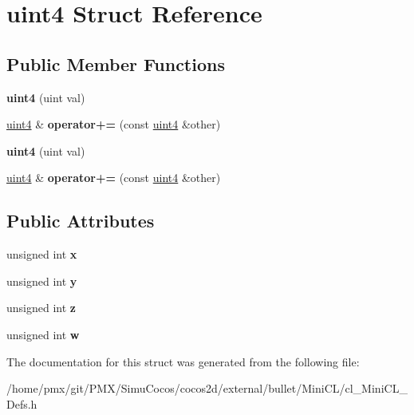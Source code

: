 \hypertarget{structuint4}{}\section{uint4 Struct Reference}
\label{structuint4}
\subsection*{Public Member Functions}
\begin{DoxyCompactItemize}
\item 
\mbox{\label{structuint4_a1804004744b3cc7230dba8c5d9082044}} 
{\bfseries uint4} (uint val)
\item 
\mbox{\label{structuint4_a684ea0df820c3d948f6745d1760df90b}} 
\hyperlink{structuint4}{uint4} \& {\bfseries operator+=} (const \hyperlink{structuint4}{uint4} \&other)
\item 
\mbox{\label{structuint4_a1804004744b3cc7230dba8c5d9082044}} 
{\bfseries uint4} (uint val)
\item 
\mbox{\label{structuint4_a684ea0df820c3d948f6745d1760df90b}} 
\hyperlink{structuint4}{uint4} \& {\bfseries operator+=} (const \hyperlink{structuint4}{uint4} \&other)
\end{DoxyCompactItemize}
\subsection*{Public Attributes}
\begin{DoxyCompactItemize}
\item 
\mbox{\label{structuint4_a8056d446b1dfa2c46affb607add6e552}} 
unsigned int {\bfseries x}
\item 
\mbox{\label{structuint4_a06c291d608ef9f914432be529714df51}} 
unsigned int {\bfseries y}
\item 
\mbox{\label{structuint4_ade2ada07e7edf0b535cd3e7a40212373}} 
unsigned int {\bfseries z}
\item 
\mbox{\label{structuint4_af15d584c473de1ca371f6655955fe256}} 
unsigned int {\bfseries w}
\end{DoxyCompactItemize}


The documentation for this struct was generated from the following file\+:\begin{DoxyCompactItemize}
\item 
/home/pmx/git/\+P\+M\+X/\+Simu\+Cocos/cocos2d/external/bullet/\+Mini\+C\+L/cl\+\_\+\+Mini\+C\+L\+\_\+\+Defs.\+h\end{DoxyCompactItemize}
